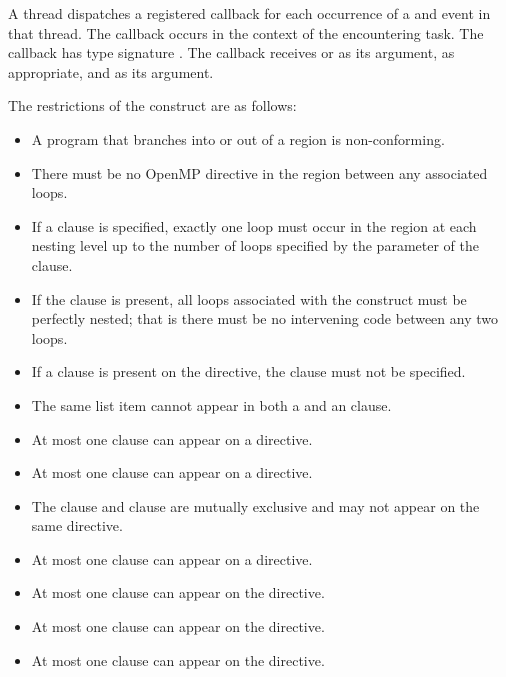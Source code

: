 \tools

A thread dispatches a registered 
callback for each occurrence of a  and
 event in that thread. The callback occurs in the
context of the encountering task.  The callback has type signature
. The callback receives
 or 
as its  argument, as appropriate, and
 as its  argument.

\restrictions
The restrictions of the  construct are as follows:
\begin{itemize}
\item A program that branches into or out of a  region is non-conforming.

\item There must be no OpenMP directive in the region between any
associated loops.

\item If a  clause is specified, exactly one loop must
occur in the region at each nesting level up to the number of loops
specified by the parameter of the  clause.

\item If the  clause is present, all loops associated
with the construct must be perfectly nested; that is there must be
no intervening code between any two loops.

\item If a  clause is present on the  directive, the  clause must not be specified.
\item The same list item cannot appear in both a  and an  clause.
\item At most one  clause can appear on a  directive.
\item At most one  clause can appear on a  directive.
\item The  clause and  clause are mutually exclusive and may not appear on the same  directive.
\item At most one  clause can appear on a  directive.
\item At most one  clause can appear on the directive.
\item At most one  clause can appear on the directive.
\item At most one  clause can appear on the directive.
\end{itemize}

